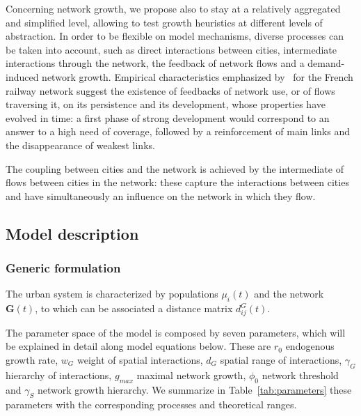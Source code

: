 \documentclass[11pt]{article}
\begin{document}
Concerning network growth, we propose also to stay at a relatively aggregated and simplified level, allowing to test growth heuristics at different levels of abstraction. In order to be flexible on model mechanisms, diverse processes can be taken into account, such as direct interactions between cities, intermediate interactions through the network, the feedback of network flows and a demand-induced network growth. Empirical characteristics emphasized by~\cite{thevenin2013mapping} for the French railway network suggest the existence of feedbacks of network use, or of flows traversing it, on its persistence and its development, whose properties have evolved in time: a first phase of strong development would correspond to an answer to a high need of coverage, followed by a reinforcement of main links and the disappearance of weakest links.


The coupling between cities and the network is achieved by the intermediate of flows between cities in the network: these capture the interactions between cities and have simultaneously an influence on the network in which they flow.



\subsection{Model description}


\subsubsection{Generic formulation}

The urban system is characterized by populations $\mu_i(t)$ and the network $\mathbf{G}(t)$, to which can be associated a distance matrix $d^G_{ij}(t)$.


The parameter space of the model is composed by seven parameters, which will be explained in detail along model equations below. These are $r_0$ endogenous growth rate, $w_G$ weight of spatial interactions, $d_G$ spatial range of interactions, $\gamma_G$ hierarchy of interactions, $g_{max}$ maximal network growth, $\phi_0$ network threshold and $\gamma_S$ network growth hierarchy. We summarize in Table~\ref{tab:parameters} these parameters with the corresponding processes and theoretical ranges.
\end{document}
